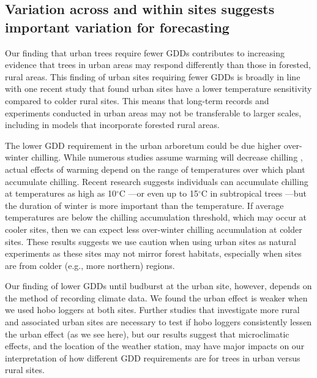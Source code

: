 \documentclass{article}\usepackage[]{graphicx}\usepackage[]{color}
\begin{document}
\subsection*{Variation across and within sites suggests important variation for forecasting} 
Our finding that urban trees require fewer GDDs contributes to increasing evidence that trees in urban areas may respond differently than those in forested, rural areas. This finding of urban sites requiring fewer GDDs is broadly in line with one recent study that found urban sites have a lower temperature sensitivity \citep{Meng2020} compared to colder rural sites. This means that long-term records and experiments conducted in urban areas may not be transferable to larger scales, including in models that incorporate forested rural areas. 

The lower GDD requirement in the urban arboretum could be due higher over-winter chilling. While numerous studies assume warming will decrease chilling \citep{Asse2018, Fu2015, Luedeling2011}, actual effects of warming depend on the range of temperatures over which plant accumulate chilling. Recent research suggests individuals can accumulate chilling at temperatures as high as 10$^{\circ}$C \citep{Baumgarten2021}---or even up to 15$^{\circ}$C in subtropical trees \citep{Zhang2021}---but the duration of winter is more important than the temperature. If average temperatures are below the chilling accumulation threshold, which may occur at cooler sites, then we can expect less over-winter chilling accumulation at colder sites. These results suggests we use caution when using urban sites as natural experiments as these sites may not mirror forest habitats, especially when sites are from colder (e.g., more northern) regions.

Our finding of lower GDDs until budburst at the urban site, however, depends on the method of recording climate data. We found the urban effect is weaker when we used hobo loggers at both sites. Further studies that investigate more rural and associated urban sites are necessary to test if hobo loggers consistently lessen the urban effect (as we see here), but our results suggest that microclimatic effects, and the location of the weather station, may have major impacts on our interpretation of how different GDD requirements are for trees in urban versus rural sites. 
\end{document}
